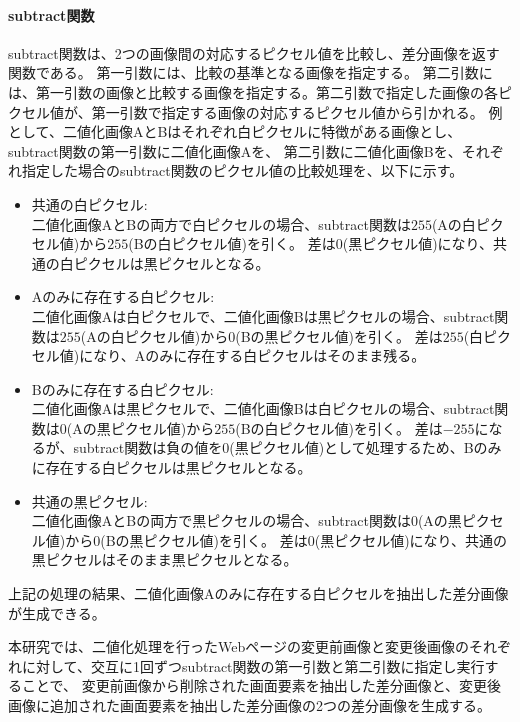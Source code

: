 \paragraph{subtract関数}
subtract関数は、2つの画像間の対応するピクセル値を比較し、差分画像を返す関数である。
第一引数には、比較の基準となる画像を指定する。
第二引数には、第一引数の画像と比較する画像を指定する。第二引数で指定した画像の各ピクセル値が、第一引数で指定する画像の対応するピクセル値から引かれる。
例として、二値化画像AとBはそれぞれ白ピクセルに特徴がある画像とし、
subtract関数の第一引数に二値化画像Aを、
第二引数に二値化画像Bを、それぞれ指定した場合のsubtract関数のピクセル値の比較処理を、以下に示す。
\par
\begin{itemize}
      \setlength{\itemsep}{0pt}
            \setlength{\parsep}{0pt}
      \item 共通の白ピクセル:\\
            二値化画像AとBの両方で白ピクセルの場合、subtract関数は$255$(Aの白ピクセル値)から$255$(Bの白ピクセル値)を引く。
            差は$0$(黒ピクセル値)になり、共通の白ピクセルは黒ピクセルとなる。
      \item Aのみに存在する白ピクセル:\\
            二値化画像Aは白ピクセルで、二値化画像Bは黒ピクセルの場合、subtract関数は$255$(Aの白ピクセル値)から$0$(Bの黒ピクセル値)を引く。
            差は$255$(白ピクセル値)になり、Aのみに存在する白ピクセルはそのまま残る。
      \item Bのみに存在する白ピクセル:\\
            二値化画像Aは黒ピクセルで、二値化画像Bは白ピクセルの場合、subtract関数は$0$(Aの黒ピクセル値)から$255$(Bの白ピクセル値)を引く。
            差は$-255$になるが、subtract関数は負の値を$0$(黒ピクセル値)として処理するため、Bのみに存在する白ピクセルは黒ピクセルとなる。
      \item 共通の黒ピクセル:\\
            二値化画像AとBの両方で黒ピクセルの場合、subtract関数は$0$(Aの黒ピクセル値)から$0$(Bの黒ピクセル値)を引く。
            差は$0$(黒ピクセル値)になり、共通の黒ピクセルはそのまま黒ピクセルとなる。
\end{itemize}
上記の処理の結果、二値化画像Aのみに存在する白ピクセルを抽出した差分画像が生成できる。
\par
本研究では、二値化処理を行ったWebページの変更前画像と変更後画像のそれぞれに対して、交互に1回ずつsubtract関数の第一引数と第二引数に指定し実行することで、
変更前画像から削除された画面要素を抽出した差分画像と、変更後画像に追加された画面要素を抽出した差分画像の2つの差分画像を生成する。
